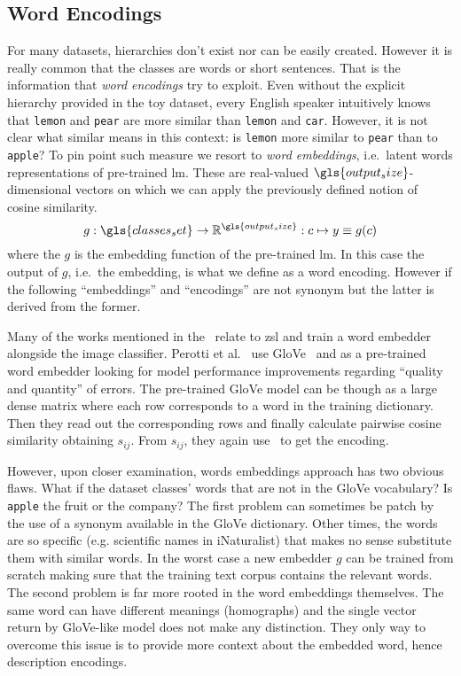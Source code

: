 \subsection{Word Encodings}
\label{subsec:word-encoding}

For many datasets, hierarchies don't exist nor can be easily created. However it is really common that the classes are words or short sentences. That is the information that \emph{word encodings} try to exploit. Even without the explicit hierarchy provided in the toy dataset, every English speaker intuitively knows that \texttt{lemon} and \texttt{pear} are more similar than \texttt{lemon} and \texttt{car}.
However, it is not clear what similar means in this context: is \texttt{lemon} more similar to \texttt{pear} than to \texttt{apple}? To pin point such measure we resort to \emph{word embeddings}, i.e.\ latent words representations of pre-trained \acrshort{lm}. These are real-valued $\gls{output_size}$-dimensional vectors on which we can apply the previously defined notion of cosine similarity.
\begin{equation}
  g : \gls{classes_set} \to \mathbb{R}^{\gls{output_size}} :
  c \mapsto y \equiv g(c)
  \label{eq:word-encoding}
\end{equation}
where the $g$ is the embedding function of the pre-trained \acrshort{lm}.
In this case the output of $g$, i.e.\ the embedding, is what we define as a word encoding. However if the following ``embeddings'' and ``encodings'' are not synonym but the latter is derived from the former.

Many of the works mentioned in the~ relate to \acrshort{zsl} and train a word embedder alongside the image classifier.
Perotti et al.~\cite{BeyondOneHotPerott2023} use GloVe~\cite{GloveGlobalVPennin2014} and as a pre-trained word embedder looking for model performance improvements regarding ``quality and quantity'' of errors. The pre-trained GloVe model can be though as a large dense matrix where each row corresponds to a word in the training dictionary. Then they read out the corresponding rows and finally calculate pairwise cosine similarity obtaining $s_{ij}$. From $s_{ij}$, they again use~ to get the encoding.

However, upon closer examination, words embeddings approach has two obvious flaws.
What if the dataset classes' words that are not in the GloVe vocabulary?
Is \texttt{apple} the fruit or the company?
The first problem can sometimes be patch by the use of a synonym available in the GloVe dictionary. Other times, the words are so specific (e.g. scientific names in iNaturalist) that makes no sense substitute them with similar words. In the worst case a new embedder $g$ can be trained from scratch making sure that the training text corpus contains the relevant words.
The second problem is far more rooted in the word embeddings themselves. The same word can have different meanings (homographs) and the single vector return by GloVe-like model does not make any distinction. They only way to overcome this issue is to provide more context about the embedded word, hence description encodings.

